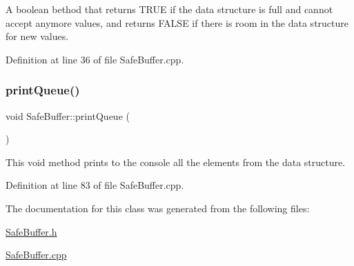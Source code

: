 A boolean bethod that returns T\+R\+UE if the data structure is full and cannot accept anymore values, and returns F\+A\+L\+SE if there is room in the data structure for new values. 



Definition at line 36 of file Safe\+Buffer.\+cpp.

\mbox{\label{classSafeBuffer_a6dec42b442f7cca40ee43fc54e8f035c}} 
\subsubsection{\texorpdfstring{print\+Queue()}{printQueue()}}
{\footnotesize\ttfamily void Safe\+Buffer\+::print\+Queue (\begin{DoxyParamCaption}{ }\end{DoxyParamCaption})}



This void method prints to the console all the elements from the data structure. 



Definition at line 83 of file Safe\+Buffer.\+cpp.



The documentation for this class was generated from the following files\+:\begin{DoxyCompactItemize}
\item 
\hyperlink{SafeBuffer_8h}{Safe\+Buffer.\+h}\item 
\hyperlink{SafeBuffer_8cpp}{Safe\+Buffer.\+cpp}\end{DoxyCompactItemize}
